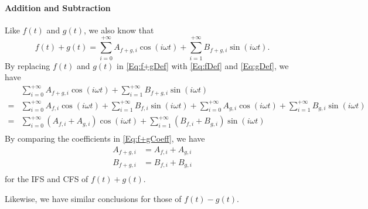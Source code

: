 \documentclass[12pt]{article}
\begin{document}
\paragraph{Addition and Subtraction}\label{App-Para:Addition&Subtraction}
Like $f(t)$ and $g(t)$, we also know that 
\begin{equation}\label{Eq:f+gDef}
f(t)+g(t)=\sum_{i=0}^{+\infty}A_{f+g, i}
\cos(i\omega t)+\sum_{i=1}^{+\infty}B_{f+g, i}\sin(i\omega t).
\end{equation} 
By replacing $f(t)$ and $g(t)$ in \autoref{Eq:f+gDef} 
with \autoref{Eq:fDef} and \autoref{Eq:gDef}, we have
\begin{equation}\label{Eq:f+gCoeff}
\begin{aligned}
&\sum_{i=0}^{+\infty}A_{f+g, i}\cos(i\omega t)
+\sum_{i=1}^{+\infty}B_{f+g, i}\sin(i\omega t)\\
=&\sum_{i=0}^{+\infty}A_{f, i}\cos(i\omega t)+\sum_{i=1}^{+\infty}
B_{f, i}\sin(i\omega t)+\sum_{i=0}^{+\infty}A_{g, i}\cos(i\omega t)
+\sum_{i=1}^{+\infty}B_{g, i}\sin(i\omega t)\\
=&\sum_{i=0}^{+\infty}(A_{f, i}+A_{g,i})\cos(i\omega t)
+\sum_{i=1}^{+\infty}(B_{f, i}+B_{g, i})\sin(i\omega t)\\
\end{aligned}
\end{equation}
By comparing the coefficients in \autoref{Eq:f+gCoeff}, we have
\begin{equation}\label{Eq:f+gConclusion}
\begin{aligned}
A_{f+g, i}&=A_{f,i}+A_{g, i}\\
B_{f+g, i}&=B_{f,i}+B_{g, i}\\
\end{aligned}
\end{equation}
for the IFS and CFS of $f(t)+g(t)$.

Likewise, we have similar conclusions for those of $f(t)-g(t)$.
\end{document}
